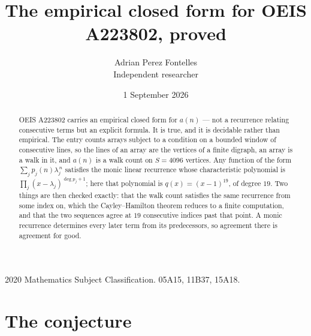\documentclass[11pt,a4paper]{article}
\title{The empirical closed form for OEIS A223802, proved}
\author{Adrian Perez Fontelles\\ \small Independent researcher}
\date{1 September 2026}
\theoremstyle{plain}
\theoremstyle{definition}
\begin{document}
\maketitle

\begin{abstract}
OEIS A223802 carries an empirical closed form for $a(n)$ --- not a recurrence relating
consecutive terms but an explicit formula. It is true, and it is decidable rather than
empirical. The entry counts arrays subject to a condition on a bounded window of consecutive lines, so the lines of an array are the
vertices of a finite digraph, an array is a walk in it, and $a(n)$ is a walk count on
$S=4096$ vertices. Any function of the form $\sum_j p_j(n)\lambda_j^{\,n}$ satisfies the
monic linear recurrence whose characteristic polynomial is
$\prod_j(x-\lambda_j)^{\deg p_j+1}$; here that polynomial is $q(x)=(x-1)^{19}$, of degree
$19$. Two things are then checked exactly: that the walk count satisfies the same
recurrence from some index on, which the Cayley--Hamilton theorem reduces to a finite
computation, and that the two sequences agree at $19$ consecutive indices past that
point. A monic recurrence determines every later term from its predecessors, so agreement
there is agreement for good.
\end{abstract}

\noindent\small 2020 Mathematics Subject Classification. 05A15, 11B37, 15A18.\normalsize

\section{The conjecture}
\end{document}
